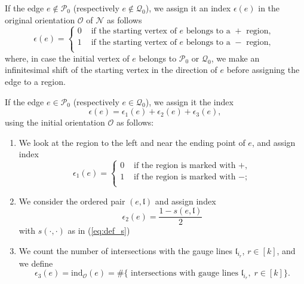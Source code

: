 \documentclass[11pt]{amsart}
\theoremstyle{plain}
\numberwithin{equation}{section}
\begin{document}
If the edge $e\not \in \mathcal P_0$ (respectively $e\not \in \mathcal Q_0$), we assign it an index $\epsilon(e)$ in the original orientation $\mathcal O$ of ${\mathcal N}$ as follows
\begin{equation}\label{eq:eps_not_path}
\epsilon (e) =
\left\{ 
\begin{array}{ll} 
0 & \mbox{ if the starting vertex of } e \mbox{ belongs to a } + \mbox{ region, }\\
1 & \mbox{ if the starting vertex of } e \mbox{ belongs to a } - \mbox{ region, }\\
\end{array}
\right.
\end{equation}
where, in case the initial vertex of $e$ belongs to $\mathcal P_0$ or $\mathcal Q_0$, we make an infinitesimal shift of the starting vertex in the direction of $e$ before assigning the edge to a region. 

If the edge $e\in \mathcal P_0$ (respectively $e\in \mathcal Q_0$), we assign it the index 
\begin{equation}\label{eq:eps_on_path}
\epsilon (e) = \epsilon_1 (e) + \epsilon_2 (e) +\epsilon_3(e),
\end{equation}
using the initial orientation $\mathcal O$ as follows:
\begin{enumerate}
\item We look at the region to the left and near the ending point of $e$, and assign index 
\[
\epsilon_1 (e) =
\left\{ 
\begin{array}{ll} 
0 & \mbox{ if the region is marked with } + ,\\
1 & \mbox{ if the region is marked with } - ;\\
\end{array}
\right.
\]
\item We consider the ordered pair $(e, \mathfrak{l})$ and assign index 
\[
\epsilon_2 (e) = \frac{1-s(e,\mathfrak{l})}{2}
\]
with $s(\cdot,\cdot)$ as in (\ref{eq:def_s})
\item We count the number of intersections with the gauge lines ${\mathfrak l}_{i_r}$, $r \in [k]$, and we define
\[
\epsilon_3 (e) = \mbox{ind}_{\mathcal O} (e) = \# \{ \mbox { intersections with gauge lines } \mathfrak{l}_{i_r}, \; r \in [k] \}.
\]
\end{enumerate}
\end{document}
